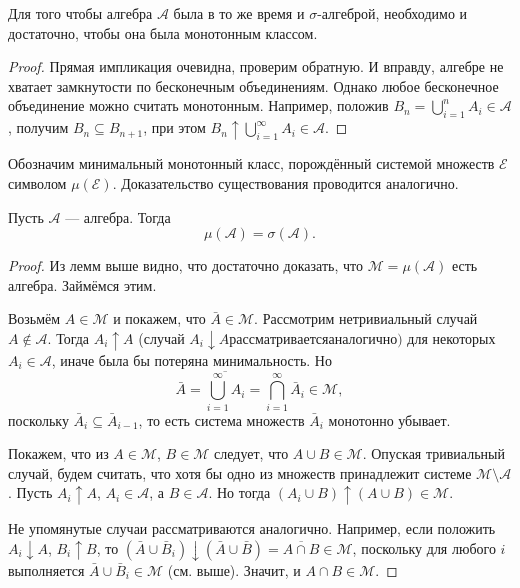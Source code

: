 \begin{lemma}
  Для того чтобы алгебра $ \mathscr A $ была в то же время и $ \sigma
  $-алгеброй, необходимо и достаточно, чтобы она была монотонным классом.
\end{lemma}
\begin{proof}
  Прямая импликация очевидна, проверим обратную. И вправду, алгебре не хватает замкнутости по бесконечным объединениям. Однако
  любое бесконечное объединение можно считать монотонным. Например, положив $
B_n = \bigcup\limits_{i=1}^n A_i \in \mathscr A $, получим $ B_n \subseteq B_{n+1} $,
при этом $ B_n \uparrow \bigcup\limits_{i=1}^\infty A_i \in \mathscr A $.
\end{proof}
Обозначим минимальный монотонный класс, порождённый системой множеств $ \mathscr
E$ символом $ \mu(\mathscr E) $. Доказательство существования проводится
аналогично.

\begin{theorem}
  Пусть $ \mathscr A $ --- алгебра. Тогда 
  \[
      \mu(\mathscr A) = \sigma(\mathscr A).
  \]
\end{theorem}
\begin{proof}
  Из лемм выше видно, что достаточно доказать, что $\mathscr M = \mu(\mathscr A) $ есть
  алгебра. Займёмся этим.

  Возьмём $ A \in \mathscr M $ и покажем, что $ \bar A \in \mathscr M $.
  Рассмотрим нетривиальный случай $ A \notin \mathscr A $. Тогда $ A_i \uparrow
  A$ (случай $ A_i \downarrow A рассматривается аналогично) $ для некоторых $ A_i \in \mathscr A $, иначе была
  бы потеряна минимальность. Но 
  \[
    \bar A =\overline{\bigcup_{i=1}^\infty A_i} = \bigcap_{i=1}^\infty \bar A_i
    \in \mathscr M,
  \]
  поскольку $ \bar A_i \subseteq \bar A_{i-1} $, то есть система множеств $ \bar
  A_i$ монотонно убывает.

  Покажем, что из $ A \in \mathscr M $, $ B \in \mathscr M $ следует, что $ A
  \cup B \in \mathscr M $. Опуская тривиальный случай, будем считать, что хотя
  бы одно из множеств принадлежит системе $ \mathscr M \setminus \mathscr A $.
  Пусть $ A_i \uparrow A $, $ A_i \in \mathscr A $, а $ B \in \mathscr A $. Но
  тогда $ (A_i\cup B) \uparrow (A\cup B) \in \mathscr M $. 

  Не упомянутые случаи
  рассматриваются аналогично. Например, если положить $ A_i \downarrow A $, $
  B_i \uparrow B $, то $ (\bar A \cup \bar B_i) \downarrow (\bar A
  \cup \bar B) = \overline{A \cap B} \in \mathscr M $, поскольку для любого $ i
  $ выполняется $ \bar A \cup \bar B_i \in \mathscr M $ (см. выше). Значит, и $ A \cap B \in
  \mathscr M$.
\end{proof}


 






